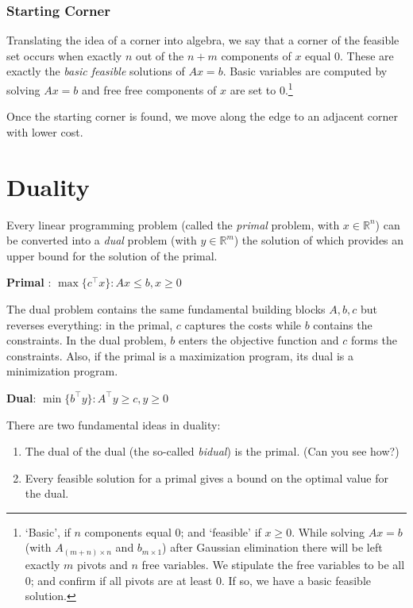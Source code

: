 \documentclass[11pt,]{article}
\providecommand{\tightlist}{%
  \setlength{\itemsep}{0pt}\setlength{\parskip}{0pt}}
\let\rmarkdownfootnote\footnote%
\def\footnote{\protect\rmarkdownfootnote}
\begin{document}
\subsubsection{Starting Corner}\label{starting-corner}

Translating the idea of a corner into algebra, we say that a corner of
the feasible set occurs when exactly \(n\) out of the \(n+m\) components
of \(x\) equal 0. These are exactly the \emph{basic feasible} solutions
of \(Ax = b\). Basic variables are computed by solving \(Ax = b\) and
free free components of \(x\) are set to 0.\footnote{`Basic', if \(n\)
  components equal 0; and `feasible' if \(x\geq 0\). While solving
  \(Ax=b\) (with \(A_{(m+n)\times n}\) and \(b_{m\times 1}\)) after
  Gaussian elimination there will be left exactly \(m\) pivots and \(n\)
  free variables. We stipulate the free variables to be all 0; and
  confirm if all pivots are at least 0. If so, we have a basic feasible
  solution.}

Once the starting corner is found, we move along the edge to an adjacent
corner with lower cost.

\section{Duality}\label{duality}

Every linear programming problem (called the \emph{primal} problem, with
\(x\in\mathbb{R}^n\)) can be converted into a \emph{dual} problem (with
\(y\in\mathbb{R}^m\)) the solution of which provides an upper bound for
the solution of the primal.

\textbf{Primal }: \(\max\{c^{\top} x\}: Ax\leq b, x\geq 0\)

The dual problem contains the same fundamental building blocks
\(A, b, c\) but reverses everything: in the primal, \(c\) captures the
costs while \(b\) contains the constraints. In the dual problem, \(b\)
enters the objective function and \(c\) forms the constraints. Also, if
the primal is a maximization program, its dual is a minimization
program.

\textbf{Dual}: \(\min\{b^{\top}y\}: A^{\top}y \geq c, y\geq 0\)

There are two fundamental ideas in duality:

\begin{enumerate}
\def\labelenumi{\arabic{enumi}.}
\tightlist
\item
  The dual of the dual (the so-called \emph{bidual}) is the primal. (Can
  you see how?)
\item
  Every feasible solution for a primal gives a bound on the optimal
  value for the dual.
\end{enumerate}
\end{document}
